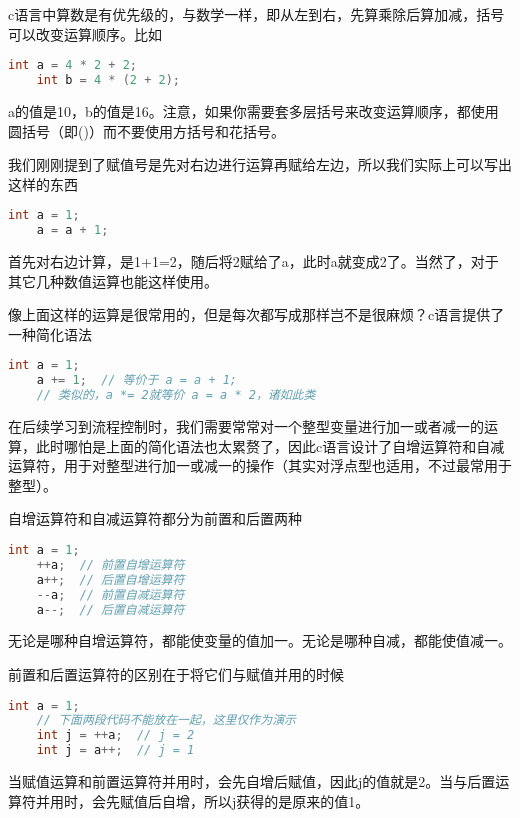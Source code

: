 c语言中算数是有优先级的，与数学一样，即从左到右，先算乘除后算加减，括号可以改变运算顺序。比如

\begin{lstlisting}[language=C]
    int a = 4 * 2 + 2;
	int b = 4 * (2 + 2);
\end{lstlisting}

a的值是10，b的值是16。注意，如果你需要套多层括号来改变运算顺序，都使用圆括号（即()）而不要使用方括号和花括号。

我们刚刚提到了赋值号是先对右边进行运算再赋给左边，所以我们实际上可以写出这样的东西

\begin{lstlisting}[language=C]
    int a = 1;
    a = a + 1;
\end{lstlisting}

首先对右边计算，是1+1=2，随后将2赋给了a，此时a就变成2了。当然了，对于其它几种数值运算也能这样使用。

像上面这样的运算是很常用的，但是每次都写成那样岂不是很麻烦？c语言提供了一种简化语法

\begin{lstlisting}[language=C]
    int a = 1;
    a += 1;  // 等价于 a = a + 1;
    // 类似的，a *= 2就等价 a = a * 2，诸如此类
\end{lstlisting}

在后续学习到流程控制时，我们需要常常对一个整型变量进行加一或者减一的运算，此时哪怕是上面的简化语法也太累赘了，因此c语言设计了自增运算符和自减运算符，用于对整型进行加一或减一的操作（其实对浮点型也适用，不过最常用于整型）。

自增运算符和自减运算符都分为前置和后置两种

\begin{lstlisting}[language=C]
    int a = 1;
    ++a;  // 前置自增运算符
    a++;  // 后置自增运算符
    --a;  // 前置自减运算符
    a--;  // 后置自减运算符
\end{lstlisting}

无论是哪种自增运算符，都能使变量的值加一。无论是哪种自减，都能使值减一。

前置和后置运算符的区别在于将它们与赋值并用的时候

\begin{lstlisting}[language=C]
    int a = 1;
    // 下面两段代码不能放在一起，这里仅作为演示
    int j = ++a;  // j = 2
    int j = a++;  // j = 1
\end{lstlisting}

当赋值运算和前置运算符并用时，会先自增后赋值，因此j的值就是2。当与后置运算符并用时，会先赋值后自增，所以j获得的是原来的值1。

